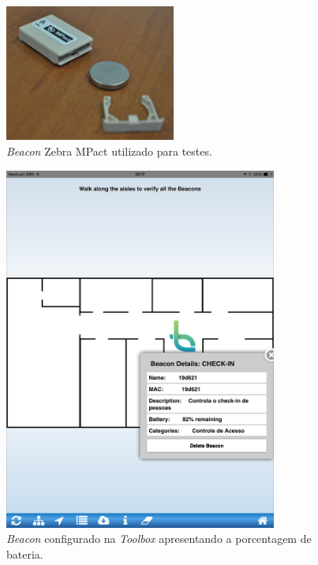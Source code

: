 \documentclass[
		12pt,				%
		openright,			%
		oneside,			%
		a4paper,			%
		chapter=TITLE,		%
		english,			%
		brazil				%
	]{abntex2}
\begin{document}
\begin{figure}[htb]
	\caption{\label{fig:zebra-mpact}\textit{Beacon} Zebra MPact utilizado para testes.}
	\begin{center}
		\includegraphics[width=0.5\textwidth]{img/beacon-mpact2.jpg}
	\end{center}
\end{figure}

\begin{figure}[htb]
	\caption{\label{fig:exemplo-toolbox}\textit{Beacon} configurado na \textit{Toolbox} apresentando a porcentagem de bateria.}
	\begin{center}
		\includegraphics[width=0.8\textwidth]{img/toolbox-exemplo.png}
	\end{center}
\end{figure}
\end{document}
